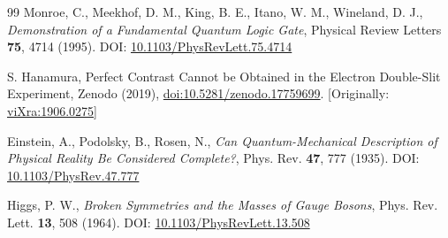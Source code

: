 \documentclass[%
 reprint,
 amsmath,amssymb,
 aps,
]{revtex4-1}
\numberwithin{equation}{section}%
\begin{document}
\begin{thebibliography}{99}
 Monroe, C., Meekhof, D. M., King, B. E., Itano, W. M., Wineland, D. J., 
\textit{Demonstration of a Fundamental Quantum Logic Gate},
Physical Review Letters \textbf{75}, 4714 (1995).
DOI: \href{https://doi.org/10.1103/PhysRevLett.75.4714}{10.1103/PhysRevLett.75.4714}

S. Hanamura, Perfect Contrast Cannot be Obtained in the Electron Double-Slit Experiment, Zenodo (2019), \href{https://doi.org/10.5281/zenodo.17759699}{doi:10.5281/zenodo.17759699}. [Originally: \href{https://vixra.org/abs/1906.0275}{viXra:1906.0275}]

 Einstein, A., Podolsky, B., Rosen, N., 
\textit{Can Quantum-Mechanical Description of Physical Reality Be Considered Complete?}, 
Phys. Rev. \textbf{47}, 777 (1935). DOI: \href{https://doi.org/10.1103/PhysRev.47.777}{10.1103/PhysRev.47.777}

 Higgs, P. W., 
\textit{Broken Symmetries and the Masses of Gauge Bosons}, 
Phys. Rev. Lett. \textbf{13}, 508 (1964). DOI: \href{https://doi.org/10.1103/PhysRevLett.13.508}{10.1103/PhysRevLett.13.508}

\end{thebibliography}



\end{document}
